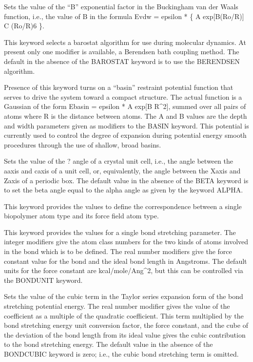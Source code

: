 \documentclass[letterpaper,11pt,english]{sphinxmanual}
\begin{document}
  Sets the value of the “B” exponential factor in the Buckingham van der Waals function, i.e., the value of B in the formula Evdw = epsilon * \{ A exp{[}\sphinxhyphen{}B(Ro/R){]} \sphinxhyphen{} C (Ro/R)6 \}.

  This keyword selects a barostat algorithm for use during molecular dynamics. At present only one modifier is available, a Berendsen bath coupling method. The default in the absence of the BAROSTAT keyword is to use the BERENDSEN algorithm.

  Presence of this keyword turns on a “basin” restraint potential function that serves to drive the system toward a compact structure. The actual function is a Gaussian of the form Ebasin = epsilon * A exp{[}\sphinxhyphen{}B R\textasciicircum{}2{]}, summed over all pairs of atoms where R is the distance between atoms. The A and B values are the depth and width parameters given as modifiers to the BASIN keyword. This potential is currently used to control the degree of expansion during potential energy smooth procedures through the use of shallow, broad basins.

  Sets the value of the ? angle of a crystal unit cell, i.e., the angle between the a\sphinxhyphen{}axis and c\sphinxhyphen{}axis of a unit cell, or, equivalently, the angle between the X\sphinxhyphen{}axis and Z\sphinxhyphen{}axis of a periodic box. The default value in the absence of the BETA keyword is to set the beta angle equal to the alpha angle as given by the keyword ALPHA.

  This keyword provides the values to define the correspondence between a single biopolymer atom type and its force field atom type.

  This keyword provides the values for a single bond stretching parameter. The integer modifiers give the atom class numbers for the two kinds of atoms involved in the bond which is to be defined. The real number modifiers give the force constant value for the bond and the ideal bond length in Angstroms. The default units for the force constant are kcal/mole/Ang\textasciicircum{}2, but this can be controlled via the BONDUNIT keyword.

  Sets the value of the cubic term in the Taylor series expansion form of the bond stretching potential energy. The real number modifier gives the value of the coefficient as a multiple of the quadratic coefficient. This term multiplied by the bond stretching energy unit conversion factor, the force constant, and the cube of the deviation of the bond length from its ideal value gives the cubic contribution to the bond stretching energy. The default value in the absence of the BOND\sphinxhyphen{}CUBIC keyword is zero; i.e., the cubic bond stretching term is omitted.
\end{document}

